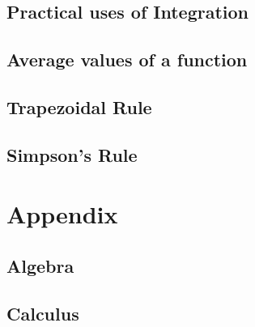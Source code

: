 \section{Practical uses of Integration}
\label{sec:PracticalUsesOfIntegration}
\lipsum[1]
\section{Average values of a function}
\label{sec:AverageValuesOfAFunction}
\lipsum[1]
\section{Trapezoidal Rule}
\label{sec:TrapezoidalRule}
\lipsum[1]
\section{Simpson's Rule}
\label{sec:SimpsonsRule}
\lipsum[1]
\chapter{Appendix}
\label{chap:Appendix}
\section{Algebra}
\lipsum[1]
\section{Calculus}
\label{sec:AppCalculus}
%
